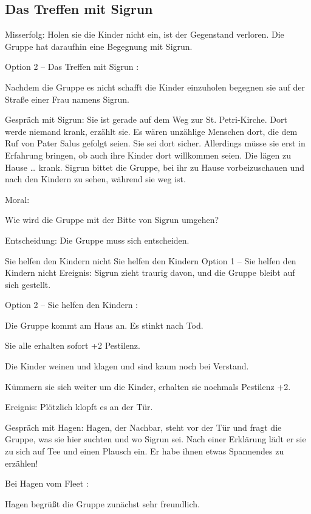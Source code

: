 \subsection{Das Treffen mit Sigrun}
\label{\neingeholt}


Misserfolg: Holen sie die Kinder nicht ein, ist der Gegenstand verloren.
Die Gruppe hat daraufhin eine Begegnung mit Sigrun.


Option 2 – Das Treffen mit Sigrun
:

Nachdem die Gruppe es nicht schafft die Kinder einzuholen begegnen sie auf der Straße einer Frau namens Sigrun.

Gespräch mit Sigrun: Sie ist gerade auf dem Weg zur St. Petri-Kirche. Dort werde niemand krank, erzählt sie. Es wären unzählige Menschen dort, die dem Ruf von Pater Salus gefolgt seien. Sie sei dort sicher. Allerdings müsse sie erst in Erfahrung bringen, ob auch ihre Kinder dort willkommen seien. Die lägen zu Hause … krank. Sigrun bittet die Gruppe, bei ihr zu Hause vorbeizuschauen und nach den Kindern zu sehen, während sie weg ist.

Moral:

Wie wird die Gruppe mit der Bitte von Sigrun umgehen?

Entscheidung: Die Gruppe muss sich entscheiden.

Sie helfen den Kindern nicht
Sie helfen den Kindern
Option 1 – Sie helfen den Kindern nicht
Ereignis: Sigrun zieht traurig davon, und die Gruppe bleibt auf sich gestellt.


Option 2 – Sie helfen den Kindern
:

Die Gruppe kommt am Haus an. Es stinkt nach Tod.

Sie alle erhalten sofort +2 Pestilenz.

Die Kinder weinen und klagen und sind kaum noch bei Verstand.

Kümmern sie sich weiter um die Kinder, erhalten sie nochmals Pestilenz +2.

Ereignis: Plötzlich klopft es an der Tür.

Gespräch mit Hagen: Hagen, der Nachbar, steht vor der Tür und fragt die Gruppe, was sie hier suchten und wo Sigrun sei. Nach einer Erklärung lädt er sie zu sich auf Tee und einen Plausch ein. Er habe ihnen etwas Spannendes zu erzählen!

Bei Hagen vom Fleet
:

Hagen begrüßt die Gruppe zunächst sehr freundlich.


